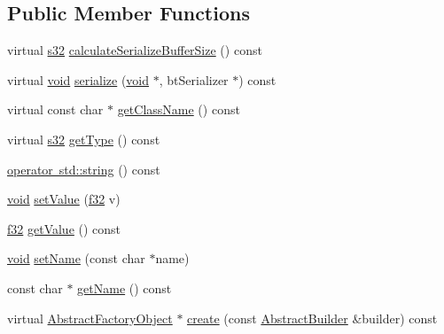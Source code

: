 \subsection*{Public Member Functions}
\begin{DoxyCompactItemize}
\item 
virtual \mbox{\hyperlink{_util_8h_aa62c75d314a0d1f37f79c4b73b2292e2}{s32}} \mbox{\hyperlink{classnjli_1_1_slider_h_u_d_ac8b3369b0456c8fa0d8765975edc3ed0}{calculate\+Serialize\+Buffer\+Size}} () const
\item 
virtual \mbox{\hyperlink{_thread_8h_af1e856da2e658414cb2456cb6f7ebc66}{void}} \mbox{\hyperlink{classnjli_1_1_slider_h_u_d_a40bc8a80246227afedf2b4cc15bb4a02}{serialize}} (\mbox{\hyperlink{_thread_8h_af1e856da2e658414cb2456cb6f7ebc66}{void}} $\ast$, bt\+Serializer $\ast$) const
\item 
virtual const char $\ast$ \mbox{\hyperlink{classnjli_1_1_slider_h_u_d_a3a5f2b2fcb08174a629f52986153a67e}{get\+Class\+Name}} () const
\item 
virtual \mbox{\hyperlink{_util_8h_aa62c75d314a0d1f37f79c4b73b2292e2}{s32}} \mbox{\hyperlink{classnjli_1_1_slider_h_u_d_a6dd59463a9e8b9ea30244b096f8785cc}{get\+Type}} () const
\item 
\mbox{\hyperlink{classnjli_1_1_slider_h_u_d_a03d13dc9d560ea5e3034f812f2562ba1}{operator std\+::string}} () const
\item 
\mbox{\hyperlink{_thread_8h_af1e856da2e658414cb2456cb6f7ebc66}{void}} \mbox{\hyperlink{classnjli_1_1_slider_h_u_d_af297ea719c95c5c078620135d8b715c5}{set\+Value}} (\mbox{\hyperlink{_util_8h_a5f6906312a689f27d70e9d086649d3fd}{f32}} v)
\item 
\mbox{\hyperlink{_util_8h_a5f6906312a689f27d70e9d086649d3fd}{f32}} \mbox{\hyperlink{classnjli_1_1_slider_h_u_d_a1fcb9ca9673e68d68845e450282d1434}{get\+Value}} () const
\item 
\mbox{\hyperlink{_thread_8h_af1e856da2e658414cb2456cb6f7ebc66}{void}} \mbox{\hyperlink{classnjli_1_1_slider_h_u_d_a087eb5f8d9f51cc476f12f1d10a3cb95}{set\+Name}} (const char $\ast$name)
\item 
const char $\ast$ \mbox{\hyperlink{classnjli_1_1_slider_h_u_d_ad41266885be835f3ee602311e20877a4}{get\+Name}} () const
\item 
virtual \mbox{\hyperlink{classnjli_1_1_abstract_factory_object}{Abstract\+Factory\+Object}} $\ast$ \mbox{\hyperlink{classnjli_1_1_slider_h_u_d_a83a8876ae63b92804004cf3febe76573}{create}} (const \mbox{\hyperlink{classnjli_1_1_abstract_builder}{Abstract\+Builder}} \&builder) const

\end{DoxyCompactItemize}
